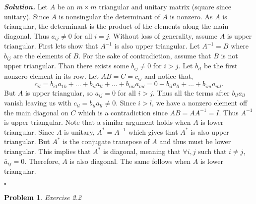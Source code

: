 \documentclass[12pt]{report}
\newtheorem{problem}{Problem}
\newenvironment{solution}[1][\it{Solution}]{\textbf{#1. } }{$\square$}
\begin{document}
\begin{solution}
    \noindent
    Let $A$ be an $m\times m$ triangular and unitary matrix (square since unitary). Since $A$ is nonsingular the determinant of $A$ is nonzero. As $A$ is triangular, the determinant  is the product of the elements along the main diagonal. Thus $a_{ij} \neq 0$ for all $i=j$. Without loss of generality, assume $A$ is upper triangular. First lets show that $A^{-1}$ is also upper triangular. Let $A^{-1} = B$ where $b_{ij}$ are the elements of $B$. For the sake of contradiction, assume that $B$ is not upper triangular. Than there exists some $b_{ij} \neq 0$ for $i > j$. Let $b_{il}$ be the first nonzero element in its row.  Let $AB = C = {c_{ij}}$ and notice that,
    $$c_{il} = b_{i1}a_{1k}+\dots+b_{il}a_{ll}+\dots+b_{im}a_{ml} = 0 + b_{il}a_{ll}+\dots+b_{im}a_{ml}.$$ 
    But $A$ is upper triangular, so $a_{ij} = 0$ for all $i > j$. Thus all the terms after $b_{il}a_{ll}$ vanish leaving us with $c_{il} = b_{il}a_{ll} \neq 0$. Since $i > l$, we have a nonzero element off the main diagonal on $C$ which is a contradiction since $AB = AA^{-1} = I$. Thus $A^{-1}$ is upper triangular. Note that a similar argument holds when $A$ is lower triangular. Since $A$ is unitary, $A^* = A^{-1}$ which gives that $A^*$ is also upper triangular. But $A^*$ is the conjugate transpose of $A$ and thus must be lower triangular. This implies that $A^*$ is diagonal, meaning that $\forall i,j$ such that $i \neq j$, $\bar{a}_{ij} = 0$. Therefore, $A$ is also diagonal. The same follows when $A$ is lower triangular.

\end{solution}

\vskip 20pt



\begin{problem}
    Exercise 2.2
\end{problem}
\end{document}
